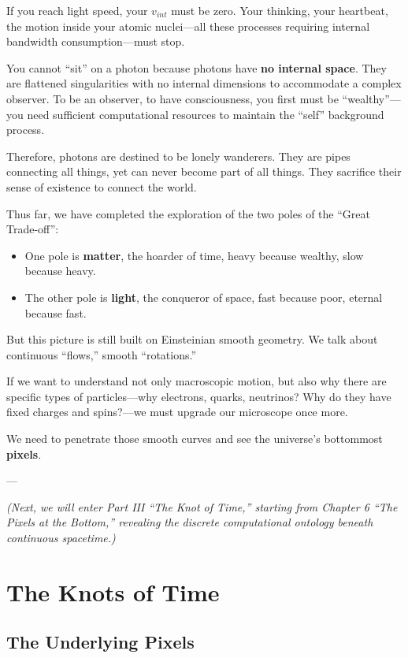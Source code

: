 \documentclass[11pt,a4paper,twoside]{book}
\begin{document}
If you reach light speed, your $v_{int}$ must be zero. Your thinking, your heartbeat, the motion inside your atomic nuclei---all these processes requiring internal bandwidth consumption---must stop.

You cannot ``sit'' on a photon because photons have \textbf{no internal space}. They are flattened singularities with no internal dimensions to accommodate a complex observer. To be an observer, to have consciousness, you first must be ``wealthy''---you need sufficient computational resources to maintain the ``self'' background process.

Therefore, photons are destined to be lonely wanderers. They are pipes connecting all things, yet can never become part of all things. They sacrifice their sense of existence to connect the world.

Thus far, we have completed the exploration of the two poles of the ``Great Trade-off'':

\begin{itemize}
\item One pole is \textbf{matter}, the hoarder of time, heavy because wealthy, slow because heavy.

\item The other pole is \textbf{light}, the conqueror of space, fast because poor, eternal because fast.
\end{itemize}

But this picture is still built on Einsteinian smooth geometry. We talk about continuous ``flows,'' smooth ``rotations.''

If we want to understand not only macroscopic motion, but also why there are specific types of particles---why electrons, quarks, neutrinos? Why do they have fixed charges and spins?---we must upgrade our microscope once more.

We need to penetrate those smooth curves and see the universe's bottommost \textbf{pixels}.

---

\textit{(Next, we will enter Part III ``The Knot of Time,'' starting from Chapter 6 ``The Pixels at the Bottom,'' revealing the discrete computational ontology beneath continuous spacetime.)}

 
\part{The Knots of Time}

\chapter{The Underlying Pixels}
\end{document}
